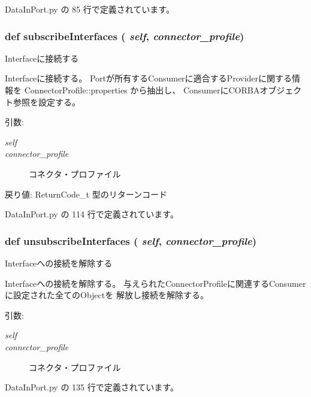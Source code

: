  DataInPort.py の 85 行で定義されています。
\subsubsection{\setlength{\rightskip}{0pt plus 5cm}def subscribeInterfaces ( {\em self},  {\em connector\_\-profile})}\label{classsource__py_1_1_data_in_port_1_1_data_in_port_9743165933e0fee41ab3b4788dc5b749}


Interfaceに接続する 

Interfaceに接続する。 Portが所有するConsumerに適合するProviderに関する情報を ConnectorProfile::properties から抽出し、 ConsumerにCORBAオブジェクト参照を設定する。

\begin{Desc}
\item[引数:]
\begin{description}
\item[{\em self}]\item[{\em connector\_\-profile}]コネクタ・プロファイル\end{description}
\end{Desc}
\begin{Desc}
\item[戻り値:]ReturnCode\_\-t 型のリターンコード \end{Desc}


 DataInPort.py の 114 行で定義されています。
\subsubsection{\setlength{\rightskip}{0pt plus 5cm}def unsubscribeInterfaces ( {\em self},  {\em connector\_\-profile})}\label{classsource__py_1_1_data_in_port_1_1_data_in_port_3bce9d1fab9e4568c5fcec276767b6dc}


Interfaceへの接続を解除する 

Interfaceへの接続を解除する。 与えられたConnectorProfileに関連するConsumerに設定された全てのObjectを 解放し接続を解除する。

\begin{Desc}
\item[引数:]
\begin{description}
\item[{\em self}]\item[{\em connector\_\-profile}]コネクタ・プロファイル \end{description}
\end{Desc}


 DataInPort.py の 135 行で定義されています。